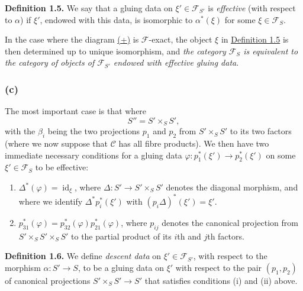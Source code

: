\documentclass{article}
\newenvironment{rmenv}[1]
  {\phantomsection\par\smallskip\noindent\textbf{#1.}\rmfamily}
  {\par\smallskip}
\newcommand{\oldpage}[1]{\marginpar{\footnotesize$\Big\vert$ \textit{p.~#1}}}
\theoremstyle{definition}
\theoremstyle{definition}
\theoremstyle{definition}
\theoremstyle{definition}
\theoremstyle{remark}
\begin{document}
\leavevmode{}%
\begin{rmenv}{Definition 1.5}
We say that a gluing data on \(\xi'\in{\mathcal{F}}_{S'}\) is \emph{effective} (with respect to \(\alpha\)) if \(\xi'\), endowed with this data, is isomorphic to \(\alpha^*(\xi)\) for some \(\xi\in{\mathcal{F}}_S\).

\end{rmenv}

In the case where the diagram \protect\hyperlink{fga-3-i-section-A.1-definition-1.3-equation}{(+)} is \({\mathcal{F}}\)-exact, the object \(\xi\) in \protect\hyperlink{fga-3-i-section-A.1-definition-1.5}{Definition 1.5} is then determined up to unique isomorphism, and \emph{the category \({\mathcal{F}}_S\) is equivalent to the category of objects of \({\mathcal{F}}_{S'}\) endowed with effective gluing data}.

\hypertarget{fga-3-i-section-A.1.c}{%
\subsubsection{(c)}\label{fga-3-i-section-A.1.c}}

The most important case is that where
\[
  S'' = S' \times_S S',
\]
with the \(\beta_i\) being the two projections \(p_1\) and \(p_2\) from \(S'\times_S S'\) to its two factors (where we now suppose that \({\mathcal{C}}\) has all fibre products).
We then have two immediate necessary conditions for a gluing data \(\varphi\colon p_1^*(\xi')\to p_2^*(\xi')\) on some \(\xi'\in{\mathcal{F}}_S\) to be effective:

\begin{enumerate}
\def\labelenumi{\roman{enumi}.}
\item
  \(\Delta^*(\varphi) = \operatorname{id}_\xi\), where \(\Delta\colon S'\to S'\times_S S'\) denotes the diagonal morphism, and where we identify \(\Delta^* p_i^*(\xi')\) with \((p_i\Delta)^*(\xi')=\xi'\).
\item
  \(p_{31}^*(\varphi) = p_{32}^*(\varphi)p_{21}^*(\varphi)\), where \(p_{ij}\) denotes the canonical projection from \(S'\times_S S'\times_S S'\) to the partial product of its \(i\)th and \(j\)th factors.
\end{enumerate}

\leavevmode{}%
\begin{rmenv}{Definition 1.6}
\oldpage{190-05}We define \emph{descent data} on \(\xi'\in{\mathcal{F}}_{S'}\), with respect to the morphism \(\alpha\colon S'\to S\), to be a gluing data on \(\xi'\) with respect to the pair \((p_1,p_2)\) of canonical projections \(S'\times_S S'\to S'\) that satisfies conditions (i) and (ii) above.

\end{rmenv}
\end{document}

